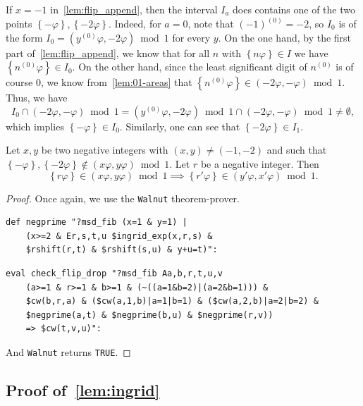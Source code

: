 \documentclass[12pt,runningheads]{llncs}
\renewcommand{\phi}{\varphi}
\newcommand{\fract}[1]{\left\{ #1 \right\}}
\newcommand{\nzero}{n^{(0)}}
\newcommand{\append}[2]{#1^{(#2)}}
\begin{document}
\begin{remark}
If $x=-1$ in~\cref{lem:flip_append}, then the interval $I_a$ does contains one of the two points $\fract{-\phi}, \fract{-2\phi}$.
Indeed, for $a = 0$, note that $\append{(-1)}{0} = -2$, so $I_0$ is of the form $I_0 =  (\append{y}{0} \phi,-2\phi) \bmod 1$ for every $y$. 
On the one hand, by the first part of~\cref{lem:flip_append}, we know that for all $n$ with $\fract{n\phi}\in I$ we have $\fract{\nzero\phi}\in I_0$. On the other hand, since the least significant digit of $\nzero$ is of course $0$, we know from~\cref{lem:01-areas} that $\fract{\nzero\phi}\in (-2\phi, -\phi)\bmod 1$. Thus, we have 
\[
    I_0 \cap (-2\phi, -\phi)\bmod 1=(\append{y}{0} \phi,-2\phi)\bmod 1 \cap (-2\phi, -\phi)\bmod 1 \neq \emptyset,
\]
which implies $\fract{-\phi} \in I_0$. Similarly, one can see that $\fract{-2\phi} \in I_1$.
\end{remark}


\begin{lemma}\label{lem:drop_flipinterval}
Let $x,y$ be two negative integers with $(x,y)\neq (-1,-2)$ and such that $\fract{-\phi} , \fract{-2\phi} \notin (x\phi,y\phi)\bmod 1$.
Let $r$ be a negative integer. Then
\[
    \fract{r\phi} \in  (x\phi,y\phi)\bmod 1
    \implies
    \fract{r'\phi} \in (y'\phi,x'\phi)\bmod 1.
\]
\end{lemma}
\begin{proof}%
Once again, we use the {\tt Walnut} theorem-prover.
\begin{verbatim}
def negprime "?msd_fib (x=1 & y=1) | 
    (x>=2 & Er,s,t,u $ingrid_exp(x,r,s) & 
    $rshift(r,t) & $rshift(s,u) & y+u=t)":
\end{verbatim}


\begin{verbatim}
eval check_flip_drop "?msd_fib Aa,b,r,t,u,v 
    (a>=1 & r>=1 & b>=1 & (~((a=1&b=2)|(a=2&b=1))) & 
    $cw(b,r,a) & ($cw(a,1,b)|a=1|b=1) & ($cw(a,2,b)|a=2|b=2) &
    $negprime(a,t) & $negprime(b,u) & $negprime(r,v)) 
    => $cw(t,v,u)":
\end{verbatim}
And {\tt Walnut} returns {\tt TRUE}.
\end{proof}

\subsection{Proof of~\cref{lem:ingrid}}
\end{document}
